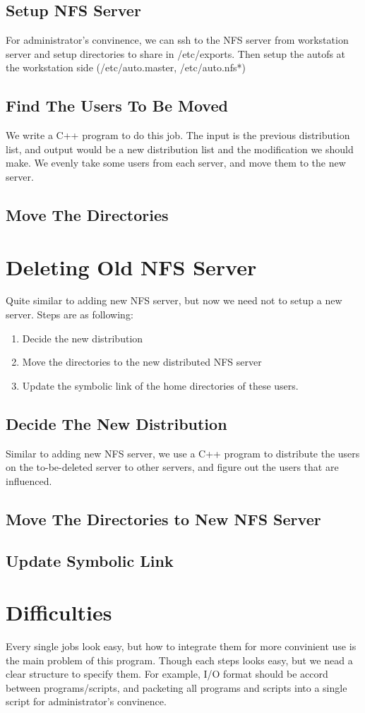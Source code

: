 \documentclass{article}
\begin{document}
\subsection{Setup NFS Server}
For administrator's convinence, we can {\cs ssh} to the NFS server from workstation server and setup directories to share in
{\cs /etc/exports}. Then setup the autofs at the workstation side ({\cs /etc/auto.master, /etc/auto.nfs*})
\subsection{Find The Users To Be Moved}
We write a C++ program to do this job. The input is the previous distribution list, and output would be a new distribution list and
the modification we should make. We evenly take some users from each server, and move them to the new server.
\subsection{Move The Directories}
\section{Deleting Old NFS Server}
Quite similar to adding new NFS server, but now we need not to setup a new server.
Steps are as following:
   \begin{enumerate}
   \item Decide the new distribution
   \item Move the directories to the new distributed NFS server
   \item Update the symbolic link of the home directories of these users.
   \end{enumerate}
\subsection{Decide The New Distribution}
Similar to adding new NFS server, we use a C++ program to distribute the users on the to-be-deleted server to other servers,
and figure out the users that are influenced.
\subsection{Move The Directories to New NFS Server}
\subsection{Update Symbolic Link}
\section{Difficulties}
Every single jobs look easy, but how to integrate them for more convinient use is the main problem of this program.
Though each steps looks easy, but we nead a clear structure to specify them. For example, I/O format should be 
accord between programs/scripts, and packeting all programs and scripts into a single script for administrator's convinence.
\end{document}
